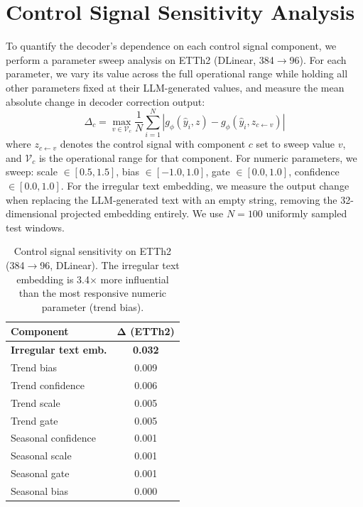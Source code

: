 

\section{Control Signal Sensitivity Analysis}
\label{app:sensitivity}

To quantify the decoder's dependence on each control signal component, we perform a parameter sweep analysis on ETTh2 (DLinear, 384$\to$96). For each parameter, we vary its value across the full operational range while holding all other parameters fixed at their LLM-generated values, and measure the mean absolute change in decoder correction output:
\begin{equation}
    \Delta_c = \max_{v \in \mathcal{V}_c} \frac{1}{N} \sum_{i=1}^{N} \left| g_\phi(\hat{y}_i, z) - g_\phi(\hat{y}_i, z_{c \leftarrow v}) \right|
\end{equation}
where $z_{c \leftarrow v}$ denotes the control signal with component $c$ set to sweep value $v$, and $\mathcal{V}_c$ is the operational range for that component. For numeric parameters, we sweep: scale $\in [0.5, 1.5]$, bias $\in [-1.0, 1.0]$, gate $\in [0.0, 1.0]$, confidence $\in [0.0, 1.0]$. For the irregular text embedding, we measure the output change when replacing the LLM-generated text with an empty string, removing the 32-dimensional projected embedding entirely. We use $N = 100$ uniformly sampled test windows.

\begin{table}[H]
\centering
\small
\begin{tabular}{lc}
\toprule
\textbf{Component} & $\boldsymbol{\Delta}$ \textbf{(ETTh2)} \\
\midrule
\textbf{Irregular text emb.} & \textbf{0.032} \\
Trend bias & 0.009 \\
Trend confidence & 0.006 \\
Trend scale & 0.005 \\
Trend gate & 0.005 \\
Seasonal confidence & 0.001 \\
Seasonal scale & 0.001 \\
Seasonal gate & 0.001 \\
Seasonal bias & 0.000 \\
\bottomrule
\end{tabular}
\caption{Control signal sensitivity on ETTh2 (384$\to$96, DLinear). The irregular text embedding is 3.4$\times$ more influential than the most responsive numeric parameter (trend bias).}
\label{tab:sensitivity}
\end{table}

